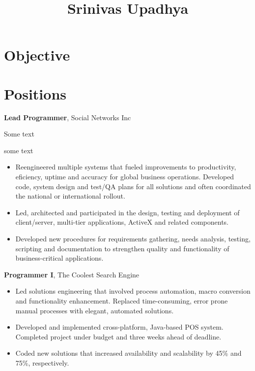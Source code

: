\documentclass[11pt]{article}
\title{\bfseries\Huge Srinivas Upadhya}
\author{}
\date{}
\begin{document}
\maketitle
\section*{Objective}
\begin{cvitem}
	\kant[1]
\end{cvitem}
%
%
\section*{Positions}
\begin{cvitem}
	\textbf{Lead Programmer}, Social Networks Inc \par
	Some text \par some text\par
	\begin{itemize}%
		\item Reengineered multiple systems that fueled improvements to productivity, eficiency, uptime and
                accuracy for global business operations. Developed code, system design and test/QA plans for
                all solutions and often coordinated the national or international rollout.
		\item Led, architected and participated in the design, testing and deployment of client/server,
                multi-tier applications, ActiveX and related components.
		\item Developed new procedures for requirements gathering, needs analysis, testing, scripting and
                documentation to strengthen quality and functionality of business-critical applications.
	\end{itemize}
\end{cvitem}%
\begin{cvitem}
	\textbf{Programmer I}, The Coolest Search Engine \par
	\begin{itemize}%
		\item Led solutions engineering that involved process automation, macro conversion and functionality
                enhancement. Replaced time-consuming, error prone manual processes with elegant, automated
                solutions.
		\item Developed and implemented cross-platform, Java-based POS system. Completed project under budget
                and three weeks ahead of deadline.
		\item Coded new solutions that increased availability and scalability by 45\% and 75\%, respectively.
	\end{itemize}
\end{cvitem}%
%
%
\end{document}
